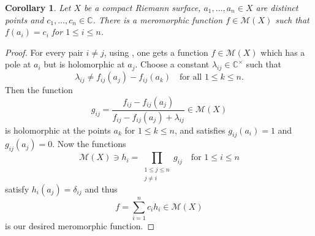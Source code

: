 \documentclass[10pt]{article}
\theoremstyle{thmstyle}
\theoremstyle{defstyle}
\newtheorem{corollary}[theorem]{Corollary}
\newcommand{\bbC}{\mathbb{C}}
\newcommand{\scrM}{\mathscr{M}}
\renewcommand{\le}{\leqslant}
\begin{document}
\begin{corollary}
    Let $X$ be a compact Riemann surface, $a_1,\dots,a_n\in X$ are distinct points and $c_1,\dots,c_n\in\bbC$. There is a meromorphic function $f\in\scrM(X)$ such that $f(a_i) = c_i$ for $1\le i\le n$.
\end{corollary}
\begin{proof}
    For every pair $i\ne j$, using , one gets a function $f\in\scrM(X)$ which has a pole at $a_i$ but is holomorphic at $a_j$. Choose a constant $\lambda_{ij}\in\bbC^\times$ such that 
    \begin{equation*}
        \lambda_{ij}\ne f_{ij}(a_j) - f_{ij}(a_k) \quad\text{for all }1\le k\le n.
    \end{equation*}
    Then the function 
    \begin{equation*}
        g_{ij} = \frac{f_{ij} - f_{ij}(a_j)}{f_{ij} - f_{ij}(a_j) + \lambda_{ij}}\in\scrM(X)
    \end{equation*}
    is holomorphic at the points $a_k$ for $1\le k\le n$, and satisfies $g_{ij}(a_i) = 1$ and $g_{ij}(a_j) = 0$. Now the functions 
    \begin{equation*}
        \scrM(X)\ni h_i = \prod_{\substack{1\le j\le n\\j\ne i}} g_{ij}\quad\text{for }1\le i\le n
    \end{equation*}
    satisfy $h_i(a_j) = \delta_{ij}$ and thus 
    \begin{equation*}
        f  = \sum_{i = 1}^n c_ih_i\in\scrM(X)
    \end{equation*}
    is our desired meromorphic function.
\end{proof}



\end{document}

